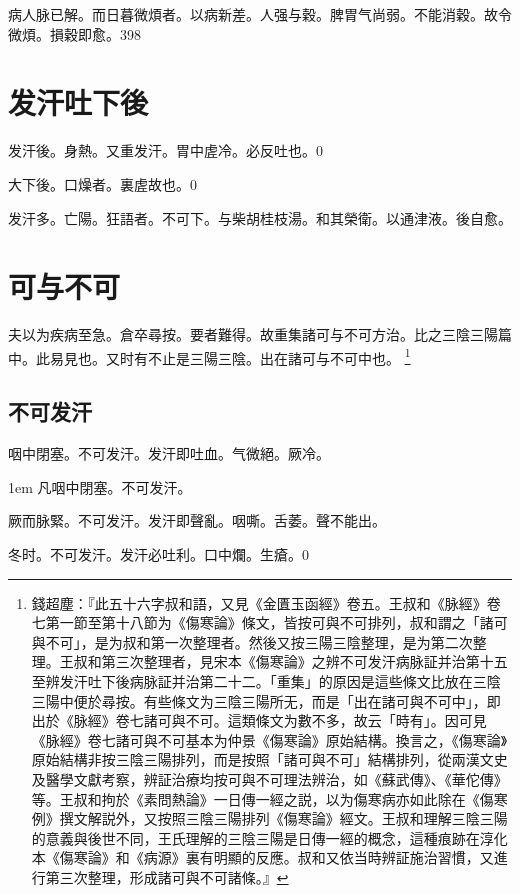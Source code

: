 病人脉已解。而日暮微煩者。以病新差。人强与穀。脾胃气尚弱。不能消穀。故令微煩。損穀即愈。398

\chapter{发汗吐下後}

发汗後。身熱。又重发汗。胃中虗冷。必反吐也。0

大下後。口燥者。裏虗故也。0

发汗多。亡陽。狂語者。不可下。与柴胡桂枝湯。和其榮衛。以通津液。後自愈。

\chapter{可与不可}

夫以为疾病至急。倉卒尋按。要者難得。故重集諸可与不可方治。比之三陰三陽篇中。此易見也。又时有不止是三陽三陰。出在諸可与不可中也。
	\footnote{
		錢超塵：『此五十六字叔和語，又見《金匱玉函經》卷五。王叔和《脉經》卷七第一節至第十八節为《傷寒論》條文，皆按可與不可排列，叔和謂之「諸可與不可」，是为叔和第一次整理者。然後又按三陽三陰整理，是为第二次整理。王叔和第三次整理者，見宋本《傷寒論》之辨不可发汗病脉証并治第十五至辨发汗吐下後病脉証并治第二十二。「重集」的原因是這些條文比放在三陰三陽中便於尋按。有些條文为三陰三陽所无，而是「出在諸可與不可中」，即出於《脉經》卷七諸可與不可。這類條文为數不多，故云「時有」。因可見《脉經》卷七諸可與不可基本为仲景《傷寒論》原始結構。換言之，《傷寒論》原始結構非按三陰三陽排列，而是按照「諸可與不可」結構排列，從兩漢文史及醫學文獻考察，辨証治療均按可與不可理法辨治，如《蘇武傳》、《華佗傳》等。王叔和拘於《素問熱論》一日傳一經之説，以为傷寒病亦如此除在《傷寒例》撰文解説外，又按照三陰三陽排列《傷寒論》經文。王叔和理解三陰三陽的意義與後世不同，王氏理解的三陰三陽是日傳一經的概念，這種痕跡在淳化本《傷寒論》和《病源》裏有明顯的反應。叔和又依当時辨証施治習慣，又進行第三次整理，形成諸可與不可諸條。』
	}

\section{不可发汗}

咽中閉塞。不可发汗。发汗即吐血。气微絕。厥冷。

\hangindent 1em
凡咽中閉塞。不可发汗。{\gaoben}

厥{\khaaitp 而脉緊}。不可发汗。发汗即聲亂。咽嘶。舌萎。聲不能出。

冬时。不可发汗。发汗必吐利。口中爛。生瘡。0

